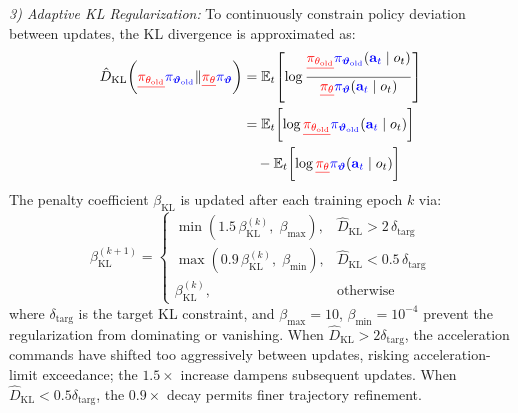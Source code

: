 \documentclass[lettersize,journal]{IEEEtran}
\newcommand{\hladd}[1]{{\color{blue}#1}}
\newcommand{\hldel}[1]{{\color{red}\sout{#1}}}
\begin{document}
\emph{3) Adaptive KL Regularization:} To continuously constrain policy deviation between updates, the KL divergence is approximated as:
\begin{equation}
\label{eq:kl_approx}
\begin{split}
\hat{D}_{\mathrm{KL}}\!\left(\hldel{\pi_{\theta_{\mathrm{old}}}}\hladd{\pi_{\boldsymbol{\vartheta}_{\mathrm{old}}}} \| \hldel{\pi_\theta}\hladd{\pi_{\boldsymbol{\vartheta}}}\right) &= \mathbb{E}_t\!\left[\log\frac{\hldel{\pi_{\theta_{\mathrm{old}}}}\hladd{\pi_{\boldsymbol{\vartheta}_{\mathrm{old}}}}(\hladd{\mathbf{a}_t} \mid o_t)}{\hldel{\pi_\theta}\hladd{\pi_{\boldsymbol{\vartheta}}}(\hladd{\mathbf{a}_t} \mid o_t)}\right] \\
&= \mathbb{E}_t\!\left[\log\hldel{\pi_{\theta_{\mathrm{old}}}}\hladd{\pi_{\boldsymbol{\vartheta}_{\mathrm{old}}}}(\hladd{\mathbf{a}_t} \mid o_t)\right] \\
&\quad - \mathbb{E}_t\!\left[\log\hldel{\pi_\theta}\hladd{\pi_{\boldsymbol{\vartheta}}}(\hladd{\mathbf{a}_t} \mid o_t)\right]
\end{split}
\end{equation}
The penalty coefficient $\beta_{\mathrm{KL}}$ is updated after each training epoch $k$ via:
\begin{equation}
\label{eq:kl_adapt}
\beta_{\mathrm{KL}}^{(k+1)} =
\begin{cases}
\min\!\left(1.5\,\beta_{\mathrm{KL}}^{(k)},\; \beta_{\max}\right), & \hat{D}_{\mathrm{KL}} > 2\,\delta_{\mathrm{targ}} \\[6pt]
\max\!\left(0.9\,\beta_{\mathrm{KL}}^{(k)},\; \beta_{\min}\right), & \hat{D}_{\mathrm{KL}} < 0.5\,\delta_{\mathrm{targ}} \\[6pt]
\beta_{\mathrm{KL}}^{(k)}, & \text{otherwise}
\end{cases}
\end{equation}
where $\delta_{\mathrm{targ}}$ is the target KL constraint, and $\beta_{\max}=10$, $\beta_{\min}=10^{-4}$ prevent the regularization from dominating or vanishing. When $\hat{D}_{\mathrm{KL}} > 2\delta_{\mathrm{targ}}$, the \hladd{acceleration commands} have shifted too aggressively between updates, risking \hladd{acceleration-limit exceedance}; the $1.5\times$ increase dampens subsequent updates. When $\hat{D}_{\mathrm{KL}} < 0.5\delta_{\mathrm{targ}}$, the $0.9\times$ decay permits finer trajectory refinement.
\end{document}
